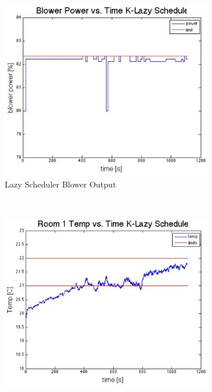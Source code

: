 \documentclass[a4paper,10pt,twocolumn]{article}
\begin{document}
\begin{figure}[b!]
	\centering
        \begin{subfigure}[t]{\linewidth}
                \centering
                \includegraphics[width=\linewidth]{k_lazy_blower}
                \caption{Lazy Scheduler Blower Output}
                \label{k_lazy_blower}
        \end{subfigure}
	\\
        \begin{subfigure}[b]{\linewidth}
                \centering
                \includegraphics[width=\linewidth]{k_lazy_rm1_temp}

\end{subfigure}
\end{figure}
\end{document}

